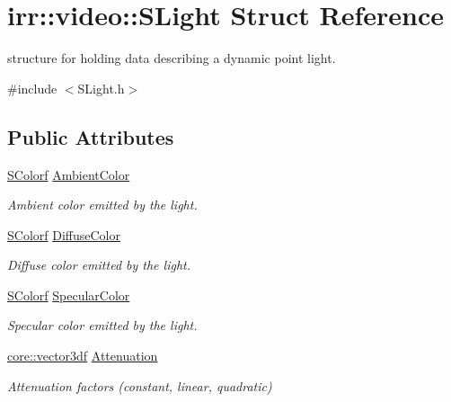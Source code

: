 \hypertarget{structirr_1_1video_1_1SLight}{}\section{irr\+:\+:video\+:\+:S\+Light Struct Reference}
\label{structirr_1_1video_1_1SLight}


structure for holding data describing a dynamic point light.  




{\ttfamily \#include $<$S\+Light.\+h$>$}

\subsection*{Public Attributes}
\begin{DoxyCompactItemize}
\item 
\mbox{\label{structirr_1_1video_1_1SLight_a120e9234a2141eb1fbe46cad23794e0e}} 
\hyperlink{classirr_1_1video_1_1SColorf}{S\+Colorf} \hyperlink{structirr_1_1video_1_1SLight_a120e9234a2141eb1fbe46cad23794e0e}{Ambient\+Color}
\begin{DoxyCompactList}\small\item\em Ambient color emitted by the light. \end{DoxyCompactList}\item 
\hyperlink{classirr_1_1video_1_1SColorf}{S\+Colorf} \hyperlink{structirr_1_1video_1_1SLight_a226622e93aa1e249fe876fdb9d0186fe}{Diffuse\+Color}
\begin{DoxyCompactList}\small\item\em Diffuse color emitted by the light. \end{DoxyCompactList}\item 
\hyperlink{classirr_1_1video_1_1SColorf}{S\+Colorf} \hyperlink{structirr_1_1video_1_1SLight_a2d66ad28850a8588b2ba727103710604}{Specular\+Color}
\begin{DoxyCompactList}\small\item\em Specular color emitted by the light. \end{DoxyCompactList}\item 
\hyperlink{namespaceirr_1_1core_a06f169d08b5c429f5575acb7edbad811}{core\+::vector3df} \hyperlink{structirr_1_1video_1_1SLight_a06c10ab01b8ad1ee554b956bd5baeacc}{Attenuation}
\begin{DoxyCompactList}\small\item\em Attenuation factors (constant, linear, quadratic) \end{DoxyCompactList}\item 

\end{DoxyCompactItemize}
